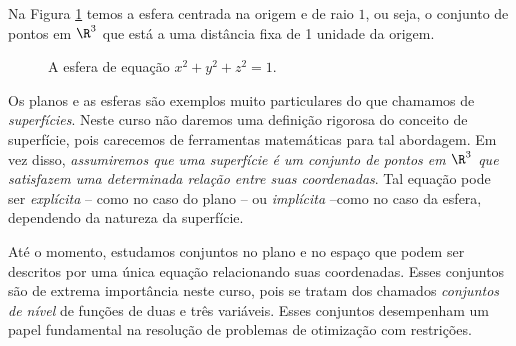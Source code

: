 Na Figura \ref{fig:esfera} temos a esfera centrada na origem e de raio $1$, ou seja, o conjunto de pontos em $\R^3$ que está a uma distância fixa de 1 unidade da origem.  
\begin{figure}[!htb]
    \centering
{}
\caption{A esfera de equação $x^2+y^2+z^2=1$.}
    \label{fig:esfera}
\end{figure}


Os planos e as esferas são exemplos muito particulares do que chamamos de \textit{superfícies}.  
Neste curso não daremos uma definição rigorosa do conceito de  superfície, pois carecemos de ferramentas matemáticas para tal abordagem. Em vez disso, \textit{assumiremos que uma superfície é um conjunto de pontos em $\R^3$ que satisfazem uma determinada relação entre suas coordenadas}. Tal equação pode ser \textit{explícita} -- como no caso do plano -- ou \textit{implícita} --como no caso da esfera, dependendo da natureza da superfície. 

Até o momento, estudamos conjuntos no plano e no espaço que podem ser descritos por uma única equação relacionando suas coordenadas. Esses conjuntos são de extrema importância neste curso, pois se tratam dos chamados \textit{conjuntos de nível} de funções de duas e três variáveis. Esses conjuntos desempenham um papel fundamental na resolução de problemas de otimização com restrições.





